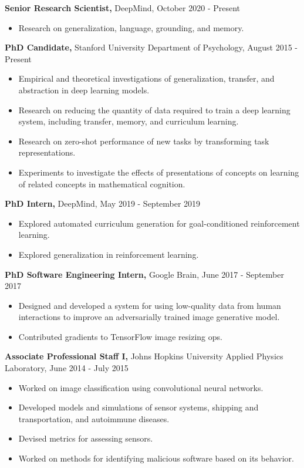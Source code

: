 \documentclass[margin]{res}
\begin{document}
\begin{resume}
{\bf Senior Research Scientist,} DeepMind, October 2020 - Present 
\begin{itemize} \itemsep -2pt
  \item Research on generalization, language, grounding, and memory. 
\end{itemize}\vspace{-8pt}
{\bf PhD Candidate,} Stanford University Department of Psychology, August 2015 - Present 
\begin{itemize} \itemsep -2pt
  \item Empirical and theoretical investigations of generalization, transfer, and abstraction in deep learning models. 
  \item Research on reducing the quantity of data required to train a deep learning system, including transfer, memory, and curriculum learning.
  \item Research on zero-shot performance of new tasks by transforming task representations.
  \item Experiments to investigate the effects of presentations of concepts on learning of related concepts in mathematical cognition.
\end{itemize}\vspace{-8pt}
{\bf PhD Intern,} DeepMind, May 2019 - September 2019
\begin{itemize} \itemsep -2pt
  \item Explored automated curriculum generation for goal-conditioned reinforcement learning.
  \item Explored generalization in reinforcement learning.
\end{itemize}\vspace{-8pt}
{\bf PhD Software Engineering Intern,} Google Brain, June 2017 - September 2017 
\begin{itemize} \itemsep -2pt
  \item Designed and developed a system for using low-quality data from human interactions to improve an adversarially trained image generative model. 
  \item Contributed gradients to TensorFlow image resizing ops.
\end{itemize}\vspace{-8pt}
{\bf Associate Professional Staff I,} Johns Hopkins University Applied Physics Laboratory, June 2014 - July 2015 
\begin{itemize} \itemsep -2pt
 \item Worked on image classification using convolutional neural networks. \item Developed models and simulations of sensor systems, shipping and transportation, and autoimmune diseases. \item Devised metrics for assessing sensors. \item Worked on methods for identifying malicious software based on its behavior. \end{itemize}\vspace{-8pt}

\end{resume}
\end{document}
